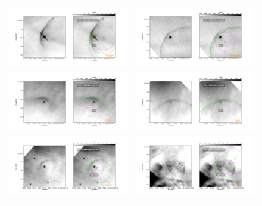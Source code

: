 \begin{figure}
  \begin{tabular}{cc}
    \includegraphics[width=0.5\linewidth]{./Figures/LL1-Bally_01-images} & \includegraphics[width=0.5\linewidth]{./Figures/LL4-Bally_24-images} \\ \includegraphics[width=0.5\linewidth]{./Figures/LL5-Bally_07-images} &
    \includegraphics[width=0.5\linewidth]{./Figures/LL6-Bally_08-images} \\ \includegraphics[width=0.5\linewidth]{./Figures/042-628-Bally_16-images} & \includegraphics[width=0.5\linewidth]{./Figures/109-246-Bally_01-images} 

\end{tabular}
\end{figure}

